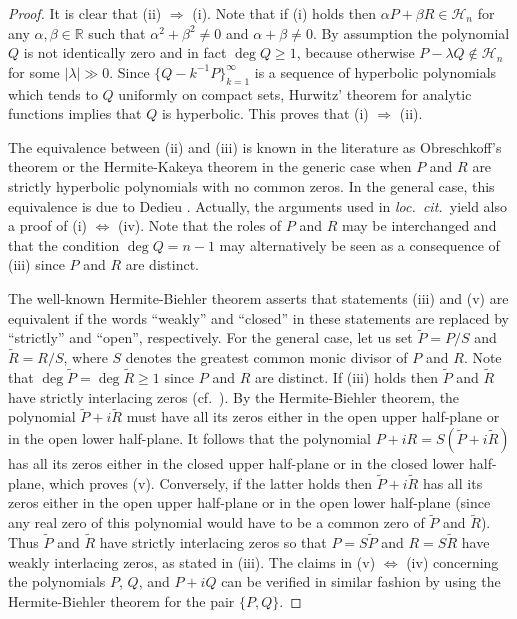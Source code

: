 \documentclass[10pt,twoside,a4paper,reqno]{amsart}
\theoremstyle{plain}
\theoremstyle{definition}
\theoremstyle{remark}
\newcommand {\bR} {\mathbb {R}}
\newcommand {\al} {\alpha}
\newcommand {\be} {\beta}
\newcommand {\la} {\lambda}
\newcommand {\calH} {\mathcal {H}}
\begin{document}
\begin{proof}
It is clear that (ii) $\Rightarrow$ (i). Note that if (i) holds then 
$\al P+\be R\in \calH_n$ for any $\al, \be\in \bR$ such 
that $\al^2+\be^2\neq 0$ and $\al +\be\neq 0$. By assumption the polynomial 
$Q$ is not identically zero and in fact $\deg Q\ge 1$, because otherwise 
$P-\la Q\notin \calH_n$ for some $|\la|\gg 0$. Since 
$\{Q-k^{-1}P\}_{k=1}^{\infty}$ is a 
sequence of hyperbolic polynomials which tends to $Q$ uniformly on compact 
sets, Hurwitz' theorem for analytic functions 
\cite[Theorem 1.6.9]{RS} implies that $Q$ is hyperbolic. This proves 
that (i) $\Rightarrow$ (ii). 

The equivalence between (ii) and (iii) is known in the literature 
as Obreschkoff's theorem \cite[Satz 5.2]{O} or the Hermite-Kakeya 
theorem \cite[Theorem 6.3.8]{RS} in the generic case when $P$ and $R$ are 
strictly hyperbolic polynomials with no common zeros. In the general case, 
this equivalence is due to Dedieu \cite[Theorem 4.1]{D}. Actually, the 
arguments used in {\em loc.~cit.~}yield also a proof of 
(i) $\Leftrightarrow$ (iv). Note that the roles of $P$ and $R$ may be 
interchanged and that the condition $\deg Q=n-1$ may alternatively be seen as 
a consequence of (iii) since $P$ and $R$ are distinct.

The well-known Hermite-Biehler theorem \cite[Theorem 6.3.4]{RS} asserts 
that statements (iii) and (v) are equivalent if the words ``weakly'' and 
``closed'' in these statements are replaced by ``strictly'' and ``open'',
respectively.
For the general case, let us set $\tilde{P}=P/S$ and 
$\tilde{R}=R/S$, where $S$ denotes the greatest common monic divisor of 
$P$ and $R$. Note that $\deg \tilde{P}=\deg \tilde{R}\ge 1$ since $P$ and $R$ 
are distinct. If (iii) holds then $\tilde{P}$ and $\tilde{R}$ have strictly 
interlacing zeros (cf.~\cite[Remark 6.3.3]{RS}). By the Hermite-Biehler 
theorem, the polynomial $\tilde{P}+i\tilde{R}$ must have all its zeros 
either in the open upper half-plane or in the open lower half-plane. It 
follows that the polynomial $P+iR=S(\tilde{P}+i\tilde{R})$ has all its zeros 
either in the closed upper half-plane or in the closed lower half-plane, which 
proves (v). Conversely, if the latter holds then $\tilde{P}+i\tilde{R}$ has 
all its zeros either in the open upper half-plane or in the open lower 
half-plane (since any real zero of this polynomial would have to be a common 
zero of $\tilde{P}$ and $\tilde{R}$). Thus $\tilde{P}$ and $\tilde{R}$ have 
strictly interlacing zeros so that $P=S\tilde{P}$ and $R=S\tilde{R}$ have 
weakly interlacing zeros, as stated in (iii). The claims in (v) 
$\Leftrightarrow$ (iv) concerning the polynomials $P$, $Q$, and $P+iQ$ can be 
verified in similar fashion by using the Hermite-Biehler theorem for the pair 
$\{P,Q\}$.
\end{proof}
\end{document}
